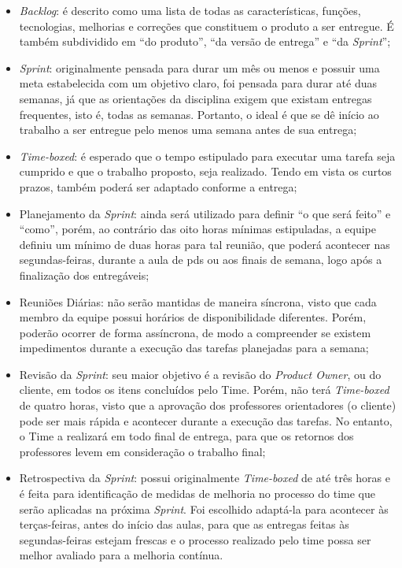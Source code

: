 \begin{itemize}
\item \textsl{Backlog}: é descrito como uma lista de todas as características, funções, tecnologias, melhorias e correções que constituem o produto a ser entregue. É também subdividido em ``do produto'', ``da versão de entrega'' e ``da \textsl{Sprint}'';

\item \textsl{Sprint}: originalmente pensada para durar um mês ou menos e possuir uma meta estabelecida com um objetivo claro, foi pensada 
para durar até duas semanas, já que as orientações da disciplina exigem que existam entregas frequentes, isto é, todas as semanas. Portanto, o ideal é que se dê início ao trabalho a ser entregue pelo menos uma semana antes de sua entrega;

\item \textsl{Time-boxed}: é esperado que o tempo estipulado para executar uma tarefa seja cumprido e que o trabalho proposto, seja realizado. Tendo em vista os curtos prazos,
também poderá ser adaptado conforme a entrega;

\item Planejamento da \textsl{Sprint}: ainda será utilizado para definir ``o que será feito'' e ``como'', porém, ao contrário das oito horas mínimas 
estipuladas, a equipe definiu um mínimo de duas horas para tal reunião, que poderá acontecer nas segundas-feiras, durante a aula de \acs{pds} ou aos finais de semana, logo após a finalização dos entregáveis;

\item Reuniões Diárias: não serão mantidas de maneira síncrona, visto que cada membro da equipe possui horários de disponibilidade diferentes. Porém, poderão ocorrer de forma assíncrona, de modo a compreender se existem impedimentos durante a execução das tarefas planejadas para a semana;

\item Revisão da \textsl{Sprint}: seu maior objetivo é a revisão do \textsl{Product Owner}, ou do cliente, em todos os itens concluídos pelo Time. Porém, 
não terá \textsl{Time-boxed} de quatro horas, visto que a aprovação dos professores orientadores (o cliente) pode ser mais rápida e acontecer durante a execução das tarefas. No entanto, o Time a realizará em todo final de entrega, para que os retornos dos professores levem em consideração o trabalho final;

\item Retrospectiva da \textsl{Sprint}: possui originalmente \textsl{Time-boxed} de até três horas e é feita para identificação 
de medidas de melhoria no processo do time que serão aplicadas na próxima \textsl{Sprint}. Foi escolhido adaptá-la para acontecer às terças-feiras, antes do início das aulas, para que as entregas feitas às segundas-feiras estejam frescas e o processo realizado pelo time possa ser melhor avaliado para a melhoria contínua.
\end{itemize}


